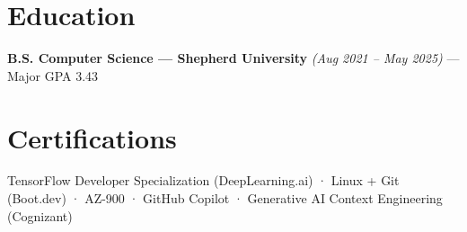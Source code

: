 \documentclass[10pt]{article}
\begin{document}
\section*{Education}
\noindent \textbf{B.S. Computer Science — Shepherd University} \textit{(Aug 2021 – May 2025)} — Major GPA 3.43\par
\section*{Certifications}
\noindent TensorFlow Developer Specialization (DeepLearning.ai) · Linux + Git (Boot.dev) · AZ-900 · GitHub Copilot · Generative AI Context Engineering (Cognizant)\par
\end{document}
